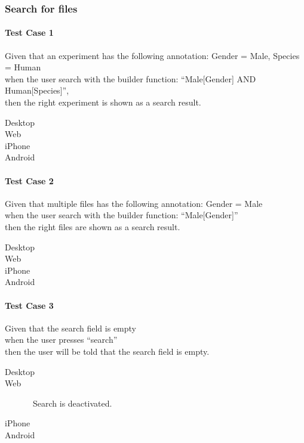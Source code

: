 \subsubsection{Search for files}
\paragraph*{Test Case 1}
Given that an experiment has the following annotation: Gender = Male, Species = Human \\ when the user search with the builder function: “Male[Gender] AND Human[Species]”, \\ then the right experiment is shown as a search result.
\begin{description}
 \item[Desktop]
 \item[Web] \cmark
 \item[iPhone] \cmark
 \item[Android]
\end{description}
\paragraph*{Test Case 2}
Given that multiple files has the following annotation: Gender = Male \\ when the user search with the builder function: “Male[Gender]” \\ then the right files are shown as a search result.
\begin{description}
 \item[Desktop]
 \item[Web] \cmark
 \item[iPhone] \cmark
 \item[Android]
\end{description}
\paragraph*{Test Case 3}
Given that the search field is empty \\ when the user presses “search” \\ then the user will be told that the search field is empty.
\begin{description}
 \item[Desktop]
 \item[Web] \cmark\ Search is deactivated.
 \item[iPhone] \cmark
 \item[Android]
\end{description}
